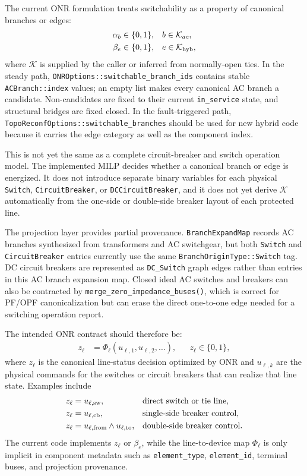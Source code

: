 The current ONR formulation treats switchability as a property of canonical
branches or edges:
\begin{align}
\alpha_b &\in \{0,1\}, && b\in\mathcal{K}_{ac},\\
\beta_e  &\in \{0,1\}, && e\in\mathcal{K}_{\mathrm{hyb}},
\end{align}
where \(\mathcal{K}\) is supplied by the caller or inferred from normally-open
ties.  In the steady path, \texttt{ONROptions::switchable\_branch\_ids} contains
stable \texttt{ACBranch::index} values; an empty list makes every canonical AC
branch a candidate.  Non-candidates are fixed to their current
\texttt{in\_service} state, and structural bridges are fixed closed.  In the
fault-triggered path, \texttt{TopoReconfOptions::switchable\_branches} should be
used for new hybrid code because it carries the edge category as well as the
component index.

This is not yet the same as a complete circuit-breaker and switch operation
model.  The implemented MILP decides whether a canonical branch or edge is
energized.  It does not introduce separate binary variables for each physical
\texttt{Switch}, \texttt{CircuitBreaker}, or \texttt{DCCircuitBreaker}, and it
does not yet derive \(\mathcal{K}\) automatically from the one-side or
double-side breaker layout of each protected line.

The projection layer provides partial provenance.  \texttt{BranchExpandMap}
records AC branches synthesized from transformers and AC switchgear, but both
\texttt{Switch} and \texttt{CircuitBreaker} entries currently use the same
\texttt{BranchOriginType::Switch} tag.  DC circuit breakers are represented as
\texttt{DC\_Switch} graph edges rather than entries in this AC branch expansion
map.  Closed ideal AC switches and breakers can also be contracted by
\texttt{merge\_zero\_impedance\_buses()}, which is correct for PF/OPF
canonicalization but can erase the direct one-to-one edge needed for a switching
operation report.

The intended ONR contract should therefore be:
\begin{align}
z_\ell &= \Phi_\ell(u_{\ell,1},u_{\ell,2},\ldots),
&& z_\ell\in\{0,1\},
\end{align}
where \(z_\ell\) is the canonical line-status decision optimized by ONR and
\(u_{\ell,k}\) are the physical commands for the switches or circuit breakers
that can realize that line state.  Examples include
\begin{align}
z_\ell &= u_{\ell,\mathrm{sw}}, && \text{direct switch or tie line},\\
z_\ell &= u_{\ell,\mathrm{cb}}, && \text{single-side breaker control},\\
z_\ell &= u_{\ell,\mathrm{from}}\land u_{\ell,\mathrm{to}},
&& \text{double-side breaker control}.
\end{align}
The current code implements \(z_\ell\) or \(\beta_e\), while the
line-to-device map \(\Phi_\ell\) is only implicit in component metadata such as
\texttt{element\_type}, \texttt{element\_id}, terminal buses, and projection
provenance.

